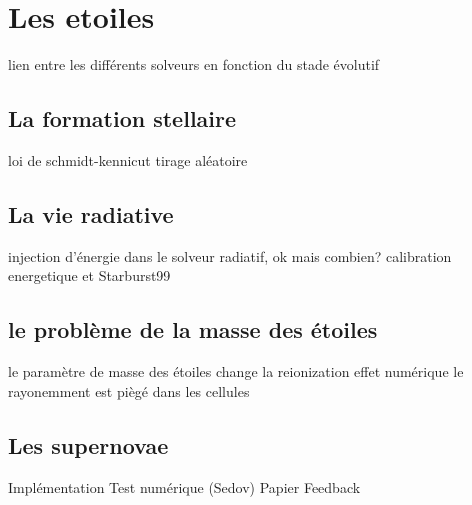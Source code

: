 \chapter{Les etoiles}

lien entre les différents solveurs en fonction du stade évolutif

\section{La formation stellaire}

loi de schmidt-kennicut
tirage aléatoire

\section{La vie radiative}

injection d'énergie dans le solveur radiatif, ok mais combien?
calibration energetique et Starburst99

\section{le problème de la masse des étoiles}

le paramètre de masse des étoiles change la reionization
effet numérique
le rayonemment est piègé dans les cellules


\section{Les supernovae}

Implémentation
Test numérique (Sedov)
Papier Feedback